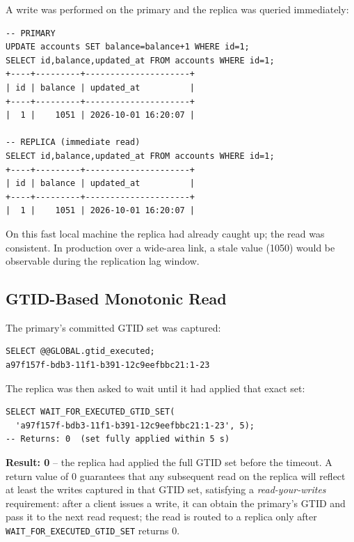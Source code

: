 \documentclass[12pt,a4paper]{article}
\begin{document}
A write was performed on the primary and the replica was queried immediately:

\begin{lstlisting}[style=bashstyle, caption={Write on primary, immediate replica read.}]
-- PRIMARY
UPDATE accounts SET balance=balance+1 WHERE id=1;
SELECT id,balance,updated_at FROM accounts WHERE id=1;
+----+---------+---------------------+
| id | balance | updated_at          |
+----+---------+---------------------+
|  1 |    1051 | 2026-10-01 16:20:07 |

-- REPLICA (immediate read)
SELECT id,balance,updated_at FROM accounts WHERE id=1;
+----+---------+---------------------+
| id | balance | updated_at          |
+----+---------+---------------------+
|  1 |    1051 | 2026-10-01 16:20:07 |
\end{lstlisting}

On this fast local machine the replica had already caught up; the read was
consistent.  In production over a wide-area link, a stale value (1050) would
be observable during the replication lag window.

\subsection{GTID-Based Monotonic Read}

The primary's committed GTID set was captured:

\begin{lstlisting}[style=bashstyle, caption={GTID set on primary.}]
SELECT @@GLOBAL.gtid_executed;
a97f157f-bdb3-11f1-b391-12c9eefbbc21:1-23
\end{lstlisting}

The replica was then asked to wait until it had applied that exact set:

\begin{lstlisting}[style=sqlstyle, caption={WAIT\_FOR\_EXECUTED\_GTID\_SET on replica.}]
SELECT WAIT_FOR_EXECUTED_GTID_SET(
  'a97f157f-bdb3-11f1-b391-12c9eefbbc21:1-23', 5);
-- Returns: 0  (set fully applied within 5 s)
\end{lstlisting}

\textbf{Result: 0} -- the replica had applied the full GTID set before the
timeout.  A return value of 0 guarantees that any subsequent read on the
replica will reflect at least the writes captured in that GTID set, satisfying
a \emph{read-your-writes} requirement: after a client issues a write, it can
obtain the primary's GTID and pass it to the next read request; the read is
routed to a replica only after \texttt{WAIT\_FOR\_EXECUTED\_GTID\_SET} returns
0.
\end{document}
